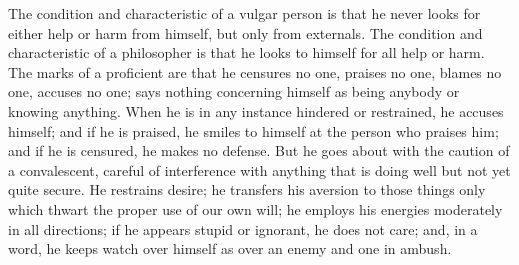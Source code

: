 The condition and characteristic of a vulgar  person is that he never looks for
either help  or harm from himself,  but only from externals.  The condition and
characteristic of  a philosopher is  that he looks to  himself for all  help or
harm. The marks  of a proficient are  that he censures no one,  praises no one,
blames no one, accuses no one; says nothing concerning himself as being anybody
or knowing  anything. When  he is  in any instance  hindered or  restrained, he
accuses himself; and if  he is praised, he smiles to himself  at the person who
praises him; and if he is censured, he makes no defense. But he goes about with
the caution  of a convalescent, careful  of interference with anything  that is
doing well  but not  yet quite  secure. He restrains  desire; he  transfers his
aversion to those things  only which thwart the proper use of  our own will; he
employs his  energies moderately  in all  directions; if  he appears  stupid or
ignorant, he does not care; and, in a word, he keeps watch over himself as over
an enemy and one in ambush.
